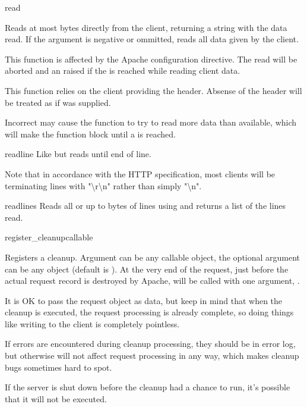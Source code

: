 \begin{methoddesc}[Request]{read}{}

Reads at most  bytes directly from the client, returning a
string with the data read. If the  argument is negative or
ommitted, reads all data given by the client.

This function is affected by the  Apache configuration
directive. The read will be aborted and an  raised
if the  is reached while reading client data.

This function relies on the client providing the 
header. Absense of the  header will be treated as
if  was supplied.

Incorrect  may cause the function to try to read
more data than available, which will make the function block until a
 is reached.

\end{methoddesc}

\begin{methoddesc}[Request]{readline}{}
Like  but reads until end of line. 
                  
Note that in accordance with the HTTP specification, most clients will
be terminating lines with "\textbackslash r\textbackslash n" rather
than simply "\textbackslash n".

\end{methoddesc}

\begin{methoddesc}[Request]{readlines}{}
Reads all or up to  bytes of lines using
 and returns a list of the lines read.
\end{methoddesc}

\begin{methoddesc}[Request]{register_cleanup}{callable}

Registers a cleanup. Argument  can be any callable
object, the optional argument  can be any object (default is
). At the very end of the request, just before the actual
request record is destroyed by Apache,  will be called
with one argument, .

It is OK to pass the request object as data, but keep in mind that
when the cleanup is executed, the request processing is already
complete, so doing things like writing to the client is completely
pointless. 

If errors are encountered during cleanup processing, they should be in
error log, but otherwise will not affect request processing in any
way, which makes cleanup bugs sometimes hard to spot.

If the server is shut down before the cleanup had a chance to run,
it's possible that it will not be executed.

\end{methoddesc}

